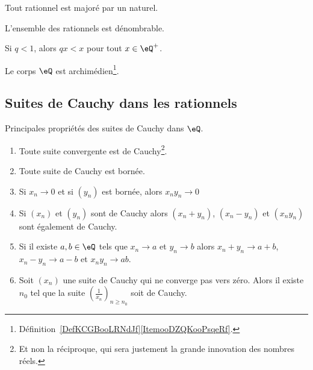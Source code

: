 \begin{lemma} \label{LEMooEBTIooGMoHsj}
    Tout rationnel est majoré par un naturel.
\end{lemma}

\begin{proposition}     \label{PROPooDHIAooZysvNs}
    L'ensemble des rationnels est dénombrable.
\end{proposition}

\begin{proposition}     \label{PROPooBTCCooVVvaeL}
    Si \( q<1\), alors \( qx<x\) pour tout \( x\in \eQ^+\).
\end{proposition}

\begin{proposition}     \label{PROPooMXGPooDUkOuv}
    Le corps \( \eQ\) est archimédien\footnote{Définition~\ref{DefKCGBooLRNdJf}\ref{ItemooDZQKooPsqeRf}.}.
\end{proposition}

\subsection{Suites de Cauchy dans les rationnels}

\begin{proposition}        \label{PropFFDJooAapQlP}
    Principales propriétés des suites de Cauchy dans \( \eQ\).
    \begin{enumerate}
        \item       \label{ItemRKCIooJguHdji}
            Toute suite convergente est de Cauchy\footnote{Et non la réciproque, qui sera justement la grande innovation des nombres réels.}.
        \item       \label{ItemRKCIooJguHdjii}
            Toute suite de Cauchy est bornée.
        \item       \label{ItemRKCIooJguHdjiii}
            Si \( x_n\to 0\) et si \( (y_n)\) est bornée, alors \( x_ny_n\to 0\)
        \item
            Si \( (x_n)\) et \( (y_n)\) sont de Cauchy alors \( (x_n+y_n)\), \( (x_n-y_n)\) et \( (x_ny_n)\) sont également de Cauchy.
        \item       \label{ITEMooIAFSooAIUpAN}
            Si il existe \( a,b\in \eQ\) tels que \( x_n\to a \) et \( y_n\to b \) alors \( x_n+y_n\to a+b\), \( x_n-y_n\to a-b\) et \(  x_ny_n\to ab  \).
        \item   \label{ItemRKCIooJguHdjvi}
            Soit \( (x_n)\) une suite de Cauchy qui ne converge pas vers zéro. Alors il existe \( n_0\) tel que la suite \( \left( \frac{1}{ x_n } \right)_{n\geq n_0}\) soit de Cauchy.
    \end{enumerate}
\end{proposition}

